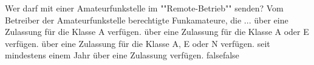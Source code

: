     {Wer darf mit einer Amateurfunkstelle im ""Remote-Betrieb"" senden? Vom Betreiber der Amateurfunkstelle berechtigte Funkamateure, die ...}
    {über eine Zulassung für die Klasse A verfügen.}
    {über eine Zulassung für die Klasse A oder E verfügen.}
    {über eine Zulassung für die Klasse A, E oder N verfügen.}
    {seit mindestens einem Jahr über eine Zulassung verfügen.}
    {false}{false}